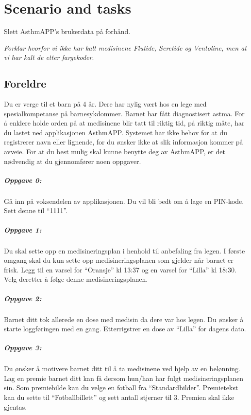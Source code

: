 \chapter{Scenario and tasks}
\label{app:scenarioandtasks}

Slett AsthmAPP's brukerdata p\r{a} forh\r{a}nd.

\emph{Forklar hvorfor vi ikke har kalt medisinene Flutide, Seretide og Ventoline, men at vi har kalt de etter fargekoder}.

\section{Foreldre}

Du er verge til et barn p\r{a}  4 \r{a}r. Dere har nylig v\ae rt hos en lege med spesialkompetanse p\r{a} barnesykdommer.
Barnet har f\r{a}tt diagnostisert astma. For \r{a} enklere holde orden p\r{a} at medisinene blir tatt til riktig tid, p\r{a} riktig m\r{a}te, 
har du lastet ned applikasjonen AsthmAPP. Systemet har ikke behov for at du registrerer navn eller lignende, 
for du \o  nsker ikke at slik informasjon kommer p\r{a} avveie. For at du best mulig skal kunne benytte deg av AsthmAPP, er det
n\o  dvendig at du gjennomf\o  rer noen oppgaver.

\paragraph{Oppgave 0:}
G\r{a} inn p\r{a} voksendelen av applikasjonen. Du vil bli bedt om \r{a} lage en PIN-kode. Sett denne til ``1111''. 

\paragraph{Oppgave 1:}
Du skal sette opp en medisineringsplan i henhold til anbefaling fra legen. I f\o rste omgang skal du kun sette opp
medisineringsplanen som gjelder n\r{a}r barnet er frisk. Legg til en varsel for ``Oransje'' kl 13:37 og en varsel for ``Lilla'' kl 18:30.
Velg deretter \r{a} f\o  lge denne medisineringsplanen.


\paragraph{Oppgave 2:}
Barnet ditt tok allerede en dose med medisin da dere var hos legen. Du \o nsker \r{a} starte loggf\o ringen med en gang. Etterrigstrer en dose
av ``Lilla'' for dagens dato.


\paragraph{Oppgave 3:}
Du \o nsker \r{a} motivere barnet ditt til \r{a} ta medisinene ved hjelp av en bel\o nning.
Lag en premie barnet ditt kan f\r{a} dersom hun/han har fulgt medisineringsplanen sin.
Som premiebilde kan du velge en fotball fra ``Standardbilder''. Premietekst kan du sette til ``Fotballbillett'' og sett antall stjerner til 3. Premien skal ikke gjentas. 


